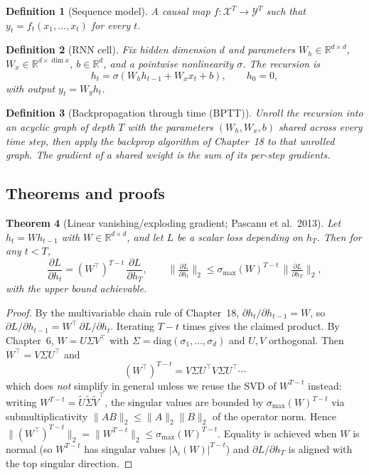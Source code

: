 \documentclass[11pt]{article}
\newtheorem{theorem}{Theorem}[section]
\newtheorem{definition}[theorem]{Definition}
\theoremstyle{remark}
\begin{document}
\begin{definition}[Sequence model]
A causal map $f : \mathcal{X}^T \to \mathcal{Y}^T$ such that
$y_t = f_t(x_1, \dots, x_t)$ for every $t$.
\end{definition}

\begin{definition}[RNN cell]
Fix hidden dimension $d$ and parameters
$W_h \in \mathbb{R}^{d \times d}$,
$W_x \in \mathbb{R}^{d \times \dim x}$, $b \in \mathbb{R}^d$, and a
pointwise nonlinearity $\sigma$. The recursion is
\[
  h_t = \sigma(W_h h_{t-1} + W_x x_t + b), \qquad h_0 = 0,
\]
with output $y_t = W_y h_t$.
\end{definition}

\begin{definition}[Backpropagation through time (BPTT)]
Unroll the recursion into an acyclic graph of depth $T$ with the
parameters $(W_h, W_x, b)$ shared across every time step, then apply
the backprop algorithm of Chapter~18 to that unrolled graph. The
gradient of a shared weight is the sum of its per-step gradients.
\end{definition}

\subsection*{Theorems and proofs}

\begin{theorem}[Linear vanishing/exploding gradient; Pascanu et al.~2013]
\label{thm:vanish}
Let $h_t = W h_{t-1}$ with $W \in \mathbb{R}^{d \times d}$, and let
$L$ be a scalar loss depending on $h_T$. Then for any $t < T$,
\[
  \frac{\partial L}{\partial h_t}
  = (W^\top)^{T-t}\,\frac{\partial L}{\partial h_T},
  \qquad
  \Big\|\tfrac{\partial L}{\partial h_t}\Big\|_2
  \leq \sigma_{\max}(W)^{T-t}\,
       \Big\|\tfrac{\partial L}{\partial h_T}\Big\|_2,
\]
with the upper bound achievable.
\end{theorem}

\begin{proof}
By the multivariable chain rule of Chapter~18,
$\partial h_t / \partial h_{t-1} = W$, so
$\partial L / \partial h_{t-1} = W^\top\,\partial L/\partial h_t$.
Iterating $T-t$ times gives the claimed product. By Chapter~6,
$W = U\Sigma V^\top$ with $\Sigma = \mathrm{diag}(\sigma_1, \dots,
\sigma_d)$ and $U, V$ orthogonal. Then $W^\top = V\Sigma U^\top$ and
\[
  (W^\top)^{T-t}
  = V \Sigma U^\top V \Sigma U^\top \cdots
\]
which does \emph{not} simplify in general unless we reuse the SVD of
$W^{T-t}$ instead: writing $W^{T-t} = \tilde U \tilde \Sigma \tilde V^\top$,
the singular values are bounded by $\sigma_{\max}(W)^{T-t}$ via
submultiplicativity $\|AB\|_2 \leq \|A\|_2\|B\|_2$ of the operator norm.
Hence
$\|(W^\top)^{T-t}\|_2 = \|W^{T-t}\|_2 \leq \sigma_{\max}(W)^{T-t}$.
Equality is achieved when $W$ is normal (so $W^{T-t}$ has singular
values $|\lambda_i(W)|^{T-t}$) and $\partial L/\partial h_T$ is aligned
with the top singular direction.
\end{proof}
\end{document}
